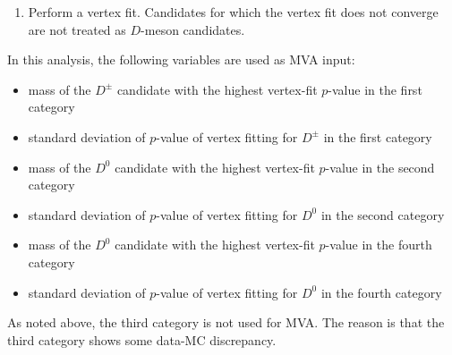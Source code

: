 \begin{enumerate}
  \begin{itemize}
    \item $D^{+} \rightarrow K_{S}^{0} \pi^{+}$
    \item $D^{+} \rightarrow K^{-} \pi^{+} \pi^{+}$
    \item $D^{+} \rightarrow K_{S}^{0} \pi^{+} \pi^{0}$
    \item $D^{+} \rightarrow K^{-} \pi^{+} \pi^{+} \pi^{0}$
    \item $D^{+} \rightarrow K_{S}^{0} \pi^{+} \pi^{0} \pi^{0}$
  \end{itemize}
  The fourth category is:
  \begin{itemize}
    \item $D^{0} \rightarrow K^{+} \pi^{-}$
    \item $D^{0} \rightarrow K_{S}^{0} \pi^{+} \pi^{-}$
    \item $D^{0} \rightarrow K^{+} \pi^{-} \pi^{+} \pi^{-}$
    \item $D^{0} \rightarrow K^{+} \pi^{-} \pi^{0}$
    \item $D^{0} \rightarrow K_{S}^{0} \pi^{+} \pi^{-} \pi^{0}$
    \item $D^{0} \rightarrow K^{+} \pi^{-} \pi^{0} \pi^{0}$
  \end{itemize}
  Including decay modes with $\pi^{0}$ mesons allows us to reconstruct a wider range of $D$ decays, but can also introduce fake $D$ candidates through ECL background.
  Excluding these modes reduces this source of fake candidates, but limits the range of reconstructed $D$ decays.
  We therefore construct both sets of candidates: the first and second categories use only modes without $\pi^{0}$, while the third and fourth categories additionally include modes with $\pi^{0}$.
  Charge-conjugate decay modes are also reconstructed.
  \item Perform a vertex fit. Candidates for which the vertex fit does not converge are not treated as $D$-meson candidates.
\end{enumerate}
In this analysis, the following variables are used as MVA input:
\begin{itemize}
  \item mass of the $D^{\pm}$ candidate with the highest vertex-fit $p$-value in the first category
  \item standard deviation of $p$-value of vertex fitting for $D^{\pm}$ in the first category
  \item mass of the $D^0$ candidate with the highest vertex-fit $p$-value in the second category
  \item standard deviation of $p$-value of vertex fitting for $D^{0}$ in the second category
  \item mass of the $D^{0}$ candidate with the highest vertex-fit $p$-value in the fourth category
  \item standard deviation of $p$-value of vertex fitting for $D^{0}$ in the fourth category
\end{itemize}
As noted above, the third category is not used for MVA.
The reason is that the third category shows some data-MC discrepancy.

